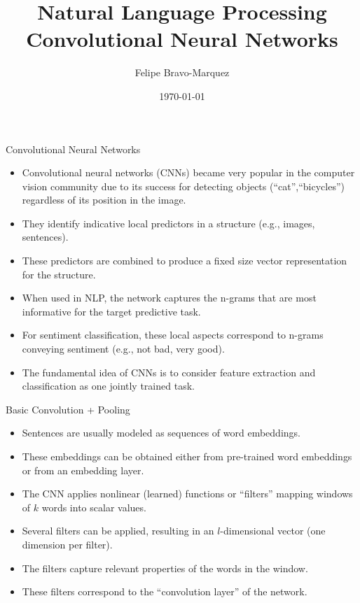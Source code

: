 \documentclass[handout]{beamer}
\title{Natural Language Processing \\ Convolutional Neural Networks}
\author[Felipe Bravo Márquez]{\footnotesize
 \textcolor[rgb]{0.00,0.00,1.00}{Felipe Bravo-Marquez}}
\date{\today}
\begin{document}
\begin{frame}
\titlepage


\end{frame}



\begin{frame}{Convolutional Neural Networks}
\begin{scriptsize}
\begin{itemize}
\item Convolutional neural networks (CNNs) became very popular in the computer vision community due to its success for detecting objects (``cat'',``bicycles'') regardless of its position in the image.
\item They identify indicative local predictors in a structure (e.g., images, sentences).
\item These predictors are combined to produce a fixed size vector representation for the structure.
\item When used in NLP, the network captures the n-grams that are most informative for the target predictive task.
\item For sentiment classification, these local aspects correspond to n-grams conveying sentiment (e.g., not bad, very good).
\item The fundamental idea of CNNs \cite{lecun1998gradient}  is  to  consider  feature extraction and classification as one jointly trained task. 

\end{itemize}
\end{scriptsize}
\end{frame}

\begin{frame}{Basic Convolution  + Pooling}
\begin{scriptsize}
\begin{itemize}
\item Sentences are usually modeled as sequences of word embeddings.
\item These embeddings can be obtained either from pre-trained word embeddings or from an embedding layer.
\item The CNN applies  nonlinear (learned) functions or ``filters'' mapping windows of $k$ words into scalar values.
\item Several filters can be applied, resulting in an $l$-dimensional vector (one dimension per filter).
\item The filters capture relevant properties of the words in the window.
\item These filters correspond to the ``convolution layer'' of the network.
\end{itemize}
\end{scriptsize}
\end{frame}
\end{document}
